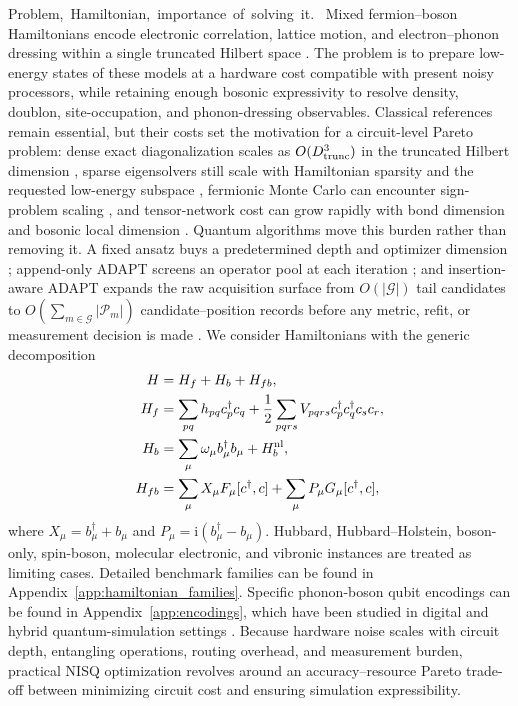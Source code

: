 \documentclass[
  reprint,
  amsmath,
  amssymb,
  aps,
  pra,
  nofootinbib,
  superscriptaddress,
  floatfix
]{revtex4-2}
\newcommand{\tentative}[1]{\textcolor{red!70!black}{#1}}
\newcommand{\structlabel}[1]{\noindent\mbox{\tentative{#1.}}~}
\newcommand{\Gset}{\mathcal{G}}
\newcommand{\Pcal}{\mathcal{P}}
\newcommand{\ii}{\mathrm{i}}
\begin{document}
\structlabel{Problem, Hamiltonian, importance of solving it}
Mixed fermion--boson Hamiltonians encode electronic correlation, lattice motion, and electron--phonon dressing within a single truncated Hilbert space \cite{Hubbard1963,Holstein1959a,Holstein1959b}.  The problem is to prepare low-energy states of these models at a hardware cost compatible with present noisy processors, while retaining enough bosonic expressivity to resolve density, doublon, site-occupation, and phonon-dressing observables.  Classical references remain essential, but their costs set the motivation for a circuit-level Pareto problem: dense exact diagonalization scales as $O(D_{\rm trunc}^3)$ in the truncated Hilbert dimension \cite{Weisse2008}, sparse eigensolvers still scale with Hamiltonian sparsity and the requested low-energy subspace \cite{Schollwock2011}, fermionic Monte Carlo can encounter sign-problem scaling \cite{Troyer2005}, and tensor-network cost can grow rapidly with bond dimension and bosonic local dimension \cite{Schollwock2011}.  Quantum algorithms move this burden rather than removing it.  A fixed ansatz buys a predetermined depth and optimizer dimension \cite{Kandala2017}; append-only ADAPT screens an operator pool at each iteration \cite{Grimsley2019}; and insertion-aware ADAPT expands the raw acquisition surface from $O(|\Gset|)$ tail candidates to $O(\sum_{m\in\Gset}|\Pcal_m|)$ candidate--position records before any metric, refit, or measurement decision is made \cite{Anastasiou2024,Ramoa2025}.  We consider Hamiltonians with the generic decomposition \cite{Dutta2024BosonicChemistry,Peng2025BosonHamiltonians}
\begin{align}
H&=H_f+H_b+H_{fb},
\nonumber\\
H_f&=\sum_{pq}h_{pq}c_p^\dagger c_q
+\frac12\sum_{pqrs}V_{pqrs}c_p^\dagger c_q^\dagger c_s c_r,
\nonumber\\
H_b&=\sum_{\mu}\omega_\mu b_\mu^\dagger b_\mu+H_b^{\rm nl},
\nonumber\\
H_{fb}&=\sum_{\mu}X_\mu F_\mu[c^\dagger,c]
+\sum_{\mu}P_\mu G_\mu[c^\dagger,c],
\label{eq:general_fb_terms_static}
\end{align}
where $X_\mu=b_\mu^\dagger+b_\mu$ and $P_\mu=\ii(b_\mu^\dagger-b_\mu)$.  Hubbard, Hubbard--Holstein, boson-only, spin-boson, molecular electronic, and vibronic instances are treated as limiting cases. Detailed benchmark families can be found in Appendix~\ref{app:hamiltonian_families}.  Specific phonon-boson qubit encodings can be found in Appendix~\ref{app:encodings}, which have been studied in digital and hybrid quantum-simulation settings \cite{Macridin2018,Sawaya2020,Li2023,Denner2023}.  Because hardware noise scales with circuit depth, entangling operations, routing overhead, and measurement burden, practical NISQ optimization revolves around an accuracy--resource Pareto trade-off between minimizing circuit cost and ensuring simulation expressibility.
\end{document}
